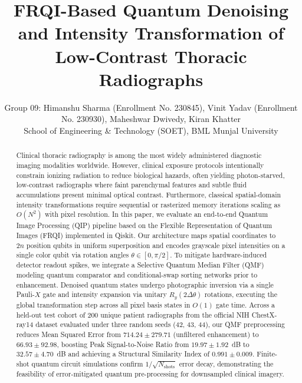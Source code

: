 \documentclass[12pt,onecolumn,draftclsnofoot]{IEEEtran}
\begin{document}
\title{FRQI-Based Quantum Denoising and Intensity Transformation of Low-Contrast Thoracic Radiographs}

\author{Group 09: Himanshu Sharma (Enrollment No. 230845), Vinit Yadav (Enrollment No. 230930), Maheshwar Dwivedy, Kiran Khatter\\
School of Engineering \& Technology (SOET), BML Munjal University}

\maketitle

\begin{abstract}
Clinical thoracic radiography is among the most widely administered diagnostic imaging modalities worldwide. However, clinical exposure protocols intentionally constrain ionizing radiation to reduce biological hazards, often yielding photon-starved, low-contrast radiographs where faint parenchymal features and subtle fluid accumulations present minimal optical contrast. Furthermore, classical spatial-domain intensity transformations require sequential or rasterized memory iterations scaling as $O(N^2)$ with pixel resolution. In this paper, we evaluate an end-to-end Quantum Image Processing (QIP) pipeline based on the Flexible Representation of Quantum Images (FRQI) implemented in Qiskit. Our architecture maps spatial coordinates to $2n$ position qubits in uniform superposition and encodes grayscale pixel intensities on a single color qubit via rotation angles $\theta \in [0, \pi/2]$. To mitigate hardware-induced detector readout spikes, we integrate a Selective Quantum Median Filter (QMF) modeling quantum comparator and conditional-swap sorting networks prior to enhancement. Denoised quantum states undergo photographic inversion via a single Pauli-$X$ gate and intensity expansion via unitary $R_y(2\Delta\theta)$ rotations, executing the global transformation step across all pixel basis states in $O(1)$ gate time. Across a held-out test cohort of 200 unique patient radiographs from the official NIH ChestX-ray14 dataset evaluated under three random seeds (42, 43, 44), our QMF preprocessing reduces Mean Squared Error from $714.24 \pm 279.71$ (unfiltered enhancement) to $66.93 \pm 92.98$, boosting Peak Signal-to-Noise Ratio from $19.97 \pm 1.92$~dB to $32.57 \pm 4.70$~dB and achieving a Structural Similarity Index of $0.991 \pm 0.009$. Finite-shot quantum circuit simulations confirm $1/\sqrt{N_{\text{shots}}}$ error decay, demonstrating the feasibility of error-mitigated quantum pre-processing for downsampled clinical imagery.
\end{abstract}
\end{document}
